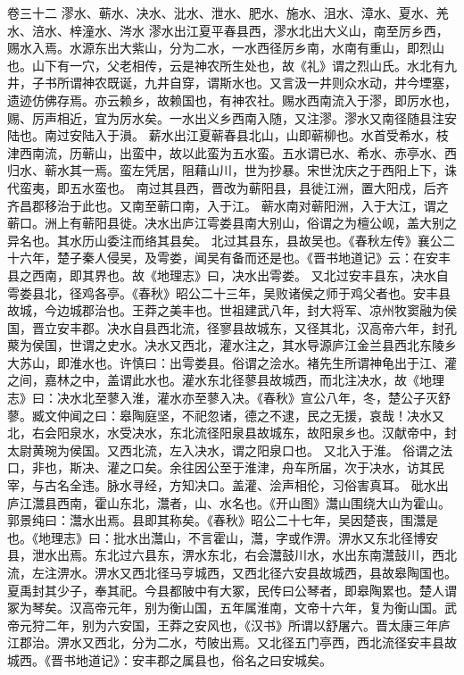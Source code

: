 \documentclass[12pt,UTF8]{ctexbook}
\begin{document}
卷三十二  漻水、蕲水、决水、沘水、泄水、肥水、施水、沮水、漳水、夏水、羌水、涪水、梓潼水、涔水 
漻水出江夏平春县西，漻水北出大义山，南至厉乡西，赐水入焉。水源东出大紫山，分为二水，一水西径厉乡南，水南有重山，即烈山也。山下有一穴，父老相传，云是神农所生处也，故《礼》谓之烈山氏。水北有九井，子书所谓神农既诞，九井自穿，谓斯水也。又言汲一井则众水动，井今堙塞，遗迹仿佛存焉。亦云赖乡，故赖国也，有神农社。赐水西南流入于漻，即厉水也，赐、厉声相近，宜为厉水矣。一水出义乡西南入随，又注漻。漻水又南径随县注安陆也。南过安陆入于溳。
薪水出江夏蕲春县北山，山即蕲柳也。水首受希水，枝津西南流，历蕲山，出蛮中，故以此蛮为五水蛮。五水谓已水、希水、赤亭水、西归水、蕲水其一焉。蛮左凭居，阻藉山川，世为抄暴。宋世沈庆之于西阳上下，诛代蛮夷，即五水蛮也。
南过其县西，晋改为蕲阳县，县徙江洲，置大阳戍，后齐齐昌郡移治于此也。又南至蕲口南，入于江。
蕲水南对蕲阳洲，入于大江，谓之蕲口。洲上有蕲阳县徙。决水出庐江雩娄县南大别山，俗谓之为檀公岘，盖大别之异名也。其水历山委注而络其县矣。
北过其县东，县故吴也。《春秋左传》襄公二十六年，楚子秦人侵吴，及雩娄，闻吴有备而还是也。《晋书地道记》云：在安丰县之西南，即其界也。故《地理志》曰，决水出雩娄。
又北过安丰县东，决水自雩娄县北，径鸡各亭。《春秋》昭公二十三年，吴败诸侯之师于鸡父者也。安丰县故城，今边城郡治也。王莽之美丰也。世祖建武八年，封大将军、凉州牧窦融为侯国，晋立安丰郡。决水自县西北流，径寥县故城东，又径其北，汉高帝六年，封孔藂为侯国，世谓之史水。决水又西北，灌水注之，其水导源庐江金兰县西北东陵乡大苏山，即淮水也。许慎曰：出雩娄县。俗谓之浍水。褚先生所谓神龟出于江、灌之间，嘉林之中，盖谓此水也。灌水东北径蓼县故城西，而北注决水，故《地理志》曰：决水北至蓼入淮，灌水亦至蓼入决。《春秋》宣公八年，冬，楚公子灭舒蓼。臧文仲闻之曰：皋陶庭坚，不祀忽诸，德之不逮，民之无援，哀哉！决水又北，右会阳泉水，水受决水，东北流径阳泉县故城东，故阳泉乡也。汉献帝中，封太尉黄琬为侯国。又西北流，左入决水，谓之阳泉口也。
又北入于淮。
俗谓之法口，非也，斯决、灌之口矣。余往因公至于淮津，舟车所届，次于决水，访其民宰，与古名全违。脉水寻经，方知决口。盖灌、浍声相伦，习俗害真耳。
砒水出庐江灊县西南，霍山东北，灊者，山、水名也。《开山图》灊山围绕大山为霍山。郭景纯曰：灊水出焉。县即其称矣。《春秋》昭公二十七年，吴因楚丧，围灊是也。《地理志》曰：批水出灊山，不言霍山，灊，字或作淠。淠水又东北径博安县，泄水出焉。东北过六县东，淠水东北，右会灊鼓川水，水出东南灊鼓川，西北流，左注淠水。淠水又西北径马亨城西，又西北径六安县故城西，县故皋陶国也。夏禹封其少子，奉其祀。今县都陂中有大冢，民传曰公琴者，即皋陶累也。楚人谓冢为琴矣。汉高帝元年，别为衡山国，五年属淮南，文帝十六年，复为衡山国。武帝元狩二年，别为六安国，王莽之安风也，《汉书》所谓以舒屠六。晋太康三年庐江郡治。淠水又西北，分为二水，芍陂出焉。又北径五门亭西，西北流径安丰县故城西。《晋书地道记》：安丰郡之属县也，俗名之曰安城矣。
\end{document}
